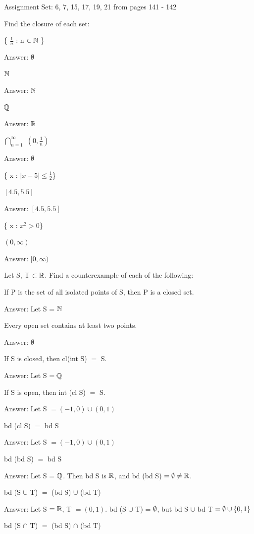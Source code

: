 \documentclass{article}
\begin{document}
Assignment Set: {6, 7, 15, 17, 19, 21} from pages 141 - 142


Find the closure of each set:

\balist
\item \{ $\frac{1}{n}$ : n $\in \mathbb{N}$ \} \

	Answer: $\emptyset$
\item $\mathbb{N}$ \
	
	Answer: $\mathbb{N}$
\item $\mathbb{Q}$ \
	
	Answer: $\mathbb{R}$
\item $\bigcap_{n=1}^\infty$ $(0, \frac{1}{n})$ \
	
	Answer: $\emptyset$
\item \{ x : $|x - 5| \leq \frac{1}{2}$\} \

	$[4.5, 5.5]$ \
	
	Answer: $[4.5, 5.5]$
\item \{ x : $x^2 > 0$\} \
	
	$(0, \infty)$ \
	
	Answer: $[0, \infty)$ \
\elist

 Let S, T $\subset \mathbb{R}$. Find a counterexample of each of the following:
\balist
\item If P is the set of all isolated points of S, then P is a closed set. \

	Answer: Let S = $\mathbb{N}$
\item Every open set contains at least two points. \

	Answer: $\emptyset$
\item If S is closed, then cl(int S) $=$ S. \

	Answer: Let S $= \mathbb{Q}$
\item If S is open, then int (cl S) $=$ S. \

	Answer: Let S $= (-1, 0) \cup (0, 1)$
\item bd (cl S) $=$ bd S \

	Answer: Let S $= (-1, 0) \cup (0, 1)$
\item bd (bd S) $=$ bd S \

	Answer: Let S = $\mathbb{Q}$. Then bd S is $\mathbb{R}$, and bd (bd S) $= \emptyset \neq \mathbb{R}$.
\item bd (S $\cup$ T) $=$ (bd S) $\cup$ (bd T) \

	Answer: Let S $= \mathbb{R}$, T $= (0, 1)$. bd (S $\cup$ T) = $\emptyset$, but bd S $\cup$ bd T $= \emptyset \cup \{0, 1\}$
\item bd (S $\cap$ T) $=$ (bd S) $\cap$ (bd T) \
\end{document}
